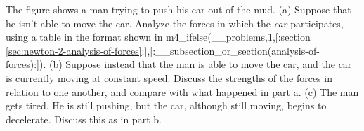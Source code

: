 The figure shows a man trying to push his car out of the mud. (a) Suppose that he isn't
able to move the car. Analyze the forces in which the \emph{car} participates,
using a table in the format shown in m4_ifelse(__problems,1,[:section \ref{sec:newton-2-analysis-of-forces}:],[:__subsection_or_section(analysis-of-forces):]).
(b) Suppose instead that the man is able to move the car, and the car is currently
moving at constant speed. Discuss the strengths of the forces in relation to one
another, and compare with what happened in part a.
(c) The man gets tired. He is still pushing, but the car, although still moving, begins to decelerate.
Discuss this as in part b.
